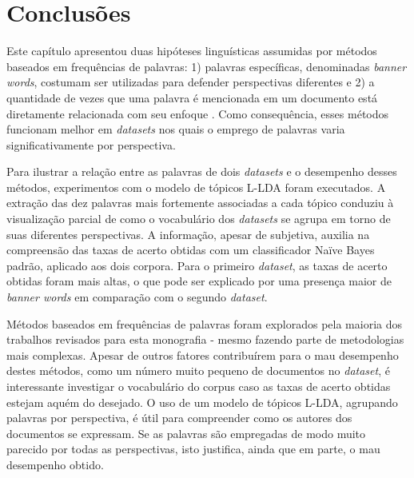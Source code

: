 \section{Conclusões}
\label{freqs:conc}

Este capítulo apresentou duas hipóteses linguísticas assumidas por métodos baseados em frequências de palavras: 1) palavras específicas, denominadas \emph{banner words}, costumam ser utilizadas para defender perspectivas diferentes e 2) a quantidade de vezes que uma palavra é mencionada em um documento está diretamente relacionada com seu enfoque \cite{teubert2001}. Como consequência, esses métodos funcionam melhor em \emph{datasets} nos quais o emprego de palavras varia significativamente por perspectiva. %


Para ilustrar a relação entre as palavras de dois \emph{datasets} e o desempenho desses métodos, experimentos com o modelo de tópicos L-LDA foram executados. A extração das dez palavras mais fortemente associadas a cada tópico conduziu à visualização parcial de como o vocabulário dos \emph{datasets} se agrupa em torno de suas diferentes perspectivas. A informação, apesar de subjetiva, auxilia na compreensão das taxas de acerto obtidas com um classificador Naïve Bayes padrão, aplicado aos dois corpora. Para o primeiro \emph{dataset}, as taxas de acerto obtidas foram mais altas, o que pode ser explicado por uma presença maior de \emph{banner words} em comparação com o segundo \emph{dataset}.

Métodos baseados em frequências de palavras foram explorados pela maioria dos trabalhos revisados para esta monografia - mesmo fazendo parte de metodologias mais complexas. Apesar de outros fatores contribuírem para o mau desempenho destes métodos, como um número muito pequeno de documentos no \emph{dataset}, é interessante investigar o vocabulário do corpus caso as taxas de acerto obtidas estejam aquém do desejado. O uso de um modelo de tópicos L-LDA, agrupando palavras por perspectiva, é útil para compreender como os autores dos documentos se expressam. Se as palavras são empregadas de modo muito parecido por todas as perspectivas, isto justifica, ainda que em parte, o mau desempenho obtido.

